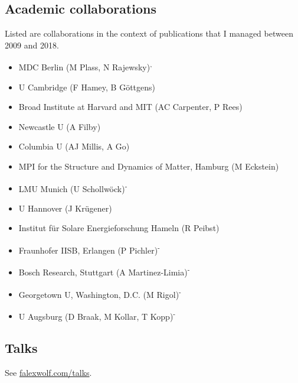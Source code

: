 \subsection*{Academic collaborations}
Listed are collaborations in the context of publications that I managed between 2009 and 2018. 
\begin{itemize}
\item MDC Berlin (M Plass, N Rajewsky)\textsuperscript{,}
\item U Cambridge (F Hamey, B Göttgens)
\item Broad Institute at Harvard and MIT (AC Carpenter, P Rees)
\item Newcastle U (A Filby)
\item Columbia U (AJ Millis, A Go)
\item MPI for the Structure and Dynamics of Matter, Hamburg (M Eckstein)
\item LMU Munich (U Schollwöck)\textsuperscript{-}
\item U Hannover (J Krügener)
\item Institut für Solare Energieforschung Hameln (R Peibst)
\item Fraunhofer IISB, Erlangen (P Pichler)\textsuperscript{-}
\item Bosch Research, Stuttgart (A Martinez-Limia)\textsuperscript{-}
\item Georgetown U, Washington, D.C. (M Rigol)\textsuperscript{-}
\item U Augsburg (D Braak, M Kollar, T Kopp)\textsuperscript{-}
\end{itemize}


\subsection*{Talks}
See \href{http://falexwolf.com/talks/}{falexwolf.com/talks}.
